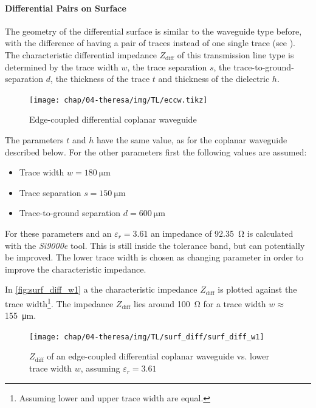 \clearpage
\paragraph{Differential Pairs on Surface}
The geometry of the differential surface is similar to the waveguide type before, with the difference of having a pair of traces instead of one single trace (see ).
The characteristic differential impedance $Z_\text{diff}$ of this transmission line type is determined by the trace width $w$, the trace separation $s$, the trace-to-ground-separation $d$, the thickness of the trace $t$ and thickness of the dielectric $h$.

\begin{figure}[H]
	\centering
	\texttt{[image: chap/04-theresa/img/TL/eccw.tikz]}
	\caption{Edge-coupled differential coplanar waveguide}
	\label{fig:eccw_geometry}
\end{figure}

The parameters $t$ and $h$ have the same value, as for the coplanar waveguide described below.
For the other parameters first the following values are assumed:
\begin{itemize}
	\item Trace width $w = \SI{180}{\micro \meter}$ 
	\item Trace separation $s = \SI{150}{\micro \meter}$
	\item Trace-to-ground separation $d = \SI{600}{\micro \meter}$
\end{itemize}
For these parameters and an $\varepsilon_r = 3.61$ an impedance of \SI{92.35}{\ohm} is calculated with the \textit{Si9000e} tool.
This is still inside the tolerance band, but can potentially be improved.
The lower trace width is chosen as changing parameter in order to improve the characteristic impedance.

In \autoref{fig:surf_diff_w1} a the characteristic impedance $Z_\text{diff}$ is plotted against the trace width\footnote{Assuming lower and upper trace width are equal.}. 
The impedance $Z_\text{diff}$ lies around \SI{100}{\ohm} for a trace width $w \approx$\SI{155}{\micro \meter}.

\begin{figure}[tb]
	\centering
	\texttt{[image: chap/04-theresa/img/TL/surf\_diff/surf\_diff\_w1]}
	\caption[DCWG, $Z_\text{diff}$ vs. $w$]{$Z_\text{diff}$ of an edge-coupled differential coplanar waveguide vs. lower trace width $w$, assuming $\varepsilon_r = 3.61$}
	\label{fig:surf_diff_w1}
\end{figure}

